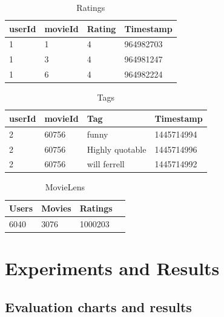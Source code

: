\documentclass{article}
\begin{document}

\begin{table}[h]
\caption{Ratings}
\centering
\begin{tabular}{llll}
\toprule
userId & movieId & Rating & Timestamp \\
\midrule
1 & 1 & 4 & 964982703 \\
1 & 3 & 4 & 964981247 \\
1 & 6 & 4 & 964982224 \\
\bottomrule
\end{tabular}
\label{tab:table1}
\end{table}

\begin{table} [h]
\caption{Tags}
\centering
\begin{tabular}{llll}
\toprule
userId & movieId & Tag & Timestamp \\
\midrule
2 & 60756 & funny & 1445714994 \\
2 & 60756 & Highly quotable & 1445714996 \\
2 & 60756 & will ferrell & 1445714992 \\
\bottomrule
\end{tabular}
\label{tab:table2}
\end{table}

\begin{table}[h]
\caption{MovieLens}
\centering
\begin{tabular}{llll}
\toprule
Users & Movies & Ratings \\
\midrule
6040 & 3076 & 1000203 \\
\bottomrule
\end{tabular}
\label{tab:table1}
\end{table}

\section{Experiments and Results}
\subsection{Evaluation charts and results}
\end{document}
